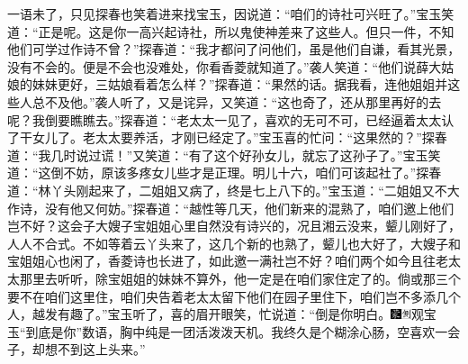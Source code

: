 一语未了，只见探春也笑着进来找宝玉，因说道：``咱们的诗社可兴旺了。''宝玉笑道：``正是呢。这是你一高兴起诗社，所以鬼使神差来了这些人。但只一件，不知他们可学过作诗不曾？''探春道：``我才都问了问他们，虽是他们自谦，看其光景，没有不会的。便是不会也没难处，你看香菱就知道了。''袭人笑道：``他们说薛大姑娘的妹妹更好，三姑娘看着怎么样？''探春道：``果然的话。据我看，连他姐姐并这些人总不及他。''袭人听了，又是诧异，又笑道：``这也奇了，还从那里再好的去呢？我倒要瞧瞧去。''探春道：``老太太一见了，喜欢的无可不可，已经逼着太太认了干女儿了。老太太要养活，才刚已经定了。''宝玉喜的忙问：``这果然的？''探春道：``我几时说过谎！''又笑道：``有了这个好孙女儿，就忘了这孙子了。''宝玉笑道：``这倒不妨，原该多疼女儿些才是正理。明儿十六，咱们可该起社了。''探春道：``林丫头刚起来了，二姐姐又病了，终是七上八下的。''宝玉道：``二姐姐又不大作诗，没有他又何妨。''探春道：``越性等几天，他们新来的混熟了，咱们邀上他们岂不好？这会子大嫂子宝姐姐心里自然没有诗兴的，况且湘云没来，颦儿刚好了，人人不合式。不如等着云丫头来了，这几个新的也熟了，颦儿也大好了，大嫂子和宝姐姐心也闲了，香菱诗也长进了，如此邀一满社岂不好？咱们两个如今且往老太太那里去听听，除宝姐姐的妹妹不算外，他一定是在咱们家住定了的。倘或那三个要不在咱们这里住，咱们央告着老太太留下他们在园子里住下，咱们岂不多添几个人，越发有趣了。''宝玉听了，喜的眉开眼笑，忙说道：``倒是你明白。{\includegraphics[width=3mm]{../Images/00006}\includegraphics[width=3mm]{../Images/00011}\footnotesize \kaishu 观宝玉``到底是你''数语，胸中纯是一团活泼泼天机。}我终久是个糊涂心肠，空喜欢一会子，却想不到这上头来。''

